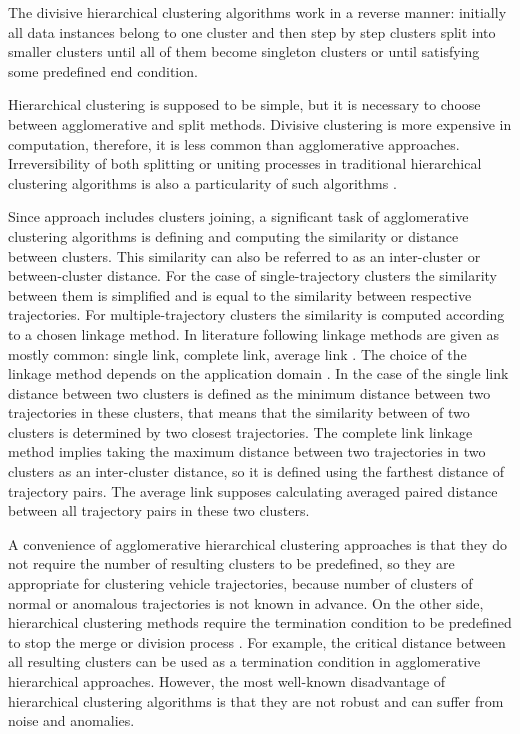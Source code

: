 The divisive hierarchical clustering algorithms work in a reverse manner: initially all data instances belong to one cluster and then step by step clusters split into smaller clusters until all of them become singleton clusters or until satisfying some predefined end condition.

Hierarchical clustering is supposed to be simple, but it is necessary to choose between agglomerative and split methods. Divisive clustering is more expensive in computation, therefore, it is less common than agglomerative approaches. Irreversibility of both splitting or uniting processes in traditional hierarchical clustering algorithms is also a particularity of such algorithms \cite{article:8_review_mot_cl_alg}.

Since approach includes clusters joining, a significant task of agglomerative clustering algorithms is defining and computing the similarity or distance between clusters. This similarity can also be referred to as an inter-cluster or between-cluster distance. For the case of single-trajectory clusters the similarity between them is simplified and is equal to the similarity between respective trajectories. For multiple-trajectory clusters the similarity is computed according to a chosen linkage method. In literature following linkage methods are given as mostly common: single link, complete link, average link \cite{article:23_survey_ca}\cite{inproceedings:7_related_work}. The choice of the linkage method depends on the application domain \cite{online:what_is_hier_clust}. In the case of the single link distance between two clusters is defined as the minimum distance between two trajectories in these clusters, that means that the similarity between of two clusters is determined by two closest trajectories. The complete link linkage method implies taking the maximum distance between two trajectories in two clusters as an inter-cluster distance, so it is defined using the farthest distance of trajectory pairs. The average link supposes calculating averaged paired distance between all trajectory pairs in these two clusters.

A convenience of agglomerative hierarchical clustering approaches is that they do not require the number of resulting clusters to be predefined, so they are appropriate for clustering vehicle trajectories, because number of clusters of normal or anomalous trajectories is not known in advance. On the other side, hierarchical clustering methods require the termination condition to be predefined to stop the merge or division process \cite{inproceedings:20_dbscan}. For example, the critical distance between all resulting clusters can be used as a termination condition in agglomerative hierarchical approaches. However, the most well-known disadvantage of hierarchical clustering algorithms is that they are not robust and can suffer from noise and anomalies. 

